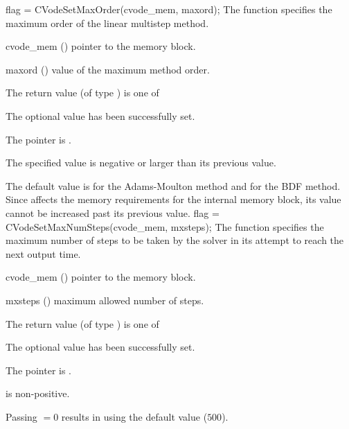 {
flag = CVodeSetMaxOrder(cvode\_mem, maxord);
}
{
  The function  specifies the maximum order of the 
  linear multistep method.
}
{
  \begin{args}
  \item[cvode\_mem] ()
    pointer to the {\cvodes} memory block.
  \item[maxord] ()
    value of the maximum method order.
  \end{args}
}
{
  The return value  (of type ) is one of
  \begin{args}
  \item[\Id{CV\_SUCCESS}] 
    The optional value has been successfully set.
  \item[\Id{CV\_MEM\_NULL}]
    The  pointer is .
  \item[\Id{CV\_ILL\_INPUT}]
    The specified value  is negative or larger than 
    its previous value.
  \end{args}
}
{
  The default value is  for
  the Adams-Moulton method and 
  for the BDF method.
  Since  affects the memory requirements
  for the internal {\cvodes} memory block, its value
  cannot be increased past its previous value.
}
{
flag = CVodeSetMaxNumSteps(cvode\_mem, mxsteps);
}
{
  The function  specifies the maximum number
  of steps to be taken by the solver in its attempt to reach 
  the next output time.
}
{
  \begin{args}
  \item[cvode\_mem] ()
    pointer to the {\cvodes} memory block.
  \item[mxsteps] ()
    maximum allowed number of steps.
  \end{args}
}
{
  The return value  (of type ) is one of
  \begin{args}
  \item[\Id{CV\_SUCCESS}] 
    The optional value has been successfully set.
  \item[\Id{CV\_MEM\_NULL}]
    The  pointer is .
  \item[\Id{CV\_ILL\_INPUT}]
     is non-positive.
  \end{args}
}
{
   Passing $=0$ results in {\cvodes} using the default value ($500$).
}
